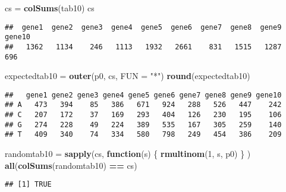 \documentclass[]{article}
\newenvironment{Shaded}{\begin{snugshade}}{\end{snugshade}}
\newcommand{\KeywordTok}[1]{\textcolor[rgb]{0.13,0.29,0.53}{\textbf{#1}}}
\newcommand{\DataTypeTok}[1]{\textcolor[rgb]{0.13,0.29,0.53}{#1}}
\newcommand{\DecValTok}[1]{\textcolor[rgb]{0.00,0.00,0.81}{#1}}
\newcommand{\StringTok}[1]{\textcolor[rgb]{0.31,0.60,0.02}{#1}}
\newcommand{\ControlFlowTok}[1]{\textcolor[rgb]{0.13,0.29,0.53}{\textbf{#1}}}
\newcommand{\OperatorTok}[1]{\textcolor[rgb]{0.81,0.36,0.00}{\textbf{#1}}}
\newcommand{\NormalTok}[1]{#1}
\begin{document}
\begin{Shaded}
\begin{Highlighting}[]
\NormalTok{cs =}\StringTok{ }\KeywordTok{colSums}\NormalTok{(tab10)}
\NormalTok{cs}
\end{Highlighting}
\end{Shaded}

\begin{verbatim}
##  gene1  gene2  gene3  gene4  gene5  gene6  gene7  gene8  gene9 gene10 
##   1362   1134    246   1113   1932   2661    831   1515   1287    696
\end{verbatim}

\begin{Shaded}
\begin{Highlighting}[]
\NormalTok{expectedtab10 =}\StringTok{ }\KeywordTok{outer}\NormalTok{(p0, cs, }\DataTypeTok{FUN =} \StringTok{"*"}\NormalTok{)}
\KeywordTok{round}\NormalTok{(expectedtab10)}
\end{Highlighting}
\end{Shaded}

\begin{verbatim}
##   gene1 gene2 gene3 gene4 gene5 gene6 gene7 gene8 gene9 gene10
## A   473   394    85   386   671   924   288   526   447    242
## C   207   172    37   169   293   404   126   230   195    106
## G   274   228    49   224   389   535   167   305   259    140
## T   409   340    74   334   580   798   249   454   386    209
\end{verbatim}

\begin{Shaded}
\begin{Highlighting}[]
\NormalTok{randomtab10 =}\StringTok{ }\KeywordTok{sapply}\NormalTok{(cs, }\ControlFlowTok{function}\NormalTok{(s) \{ }\KeywordTok{rmultinom}\NormalTok{(}\DecValTok{1}\NormalTok{, s, p0) \} )}
\KeywordTok{all}\NormalTok{(}\KeywordTok{colSums}\NormalTok{(randomtab10) }\OperatorTok{==}\StringTok{ }\NormalTok{cs)}
\end{Highlighting}
\end{Shaded}

\begin{verbatim}
## [1] TRUE
\end{verbatim}
\end{document}
